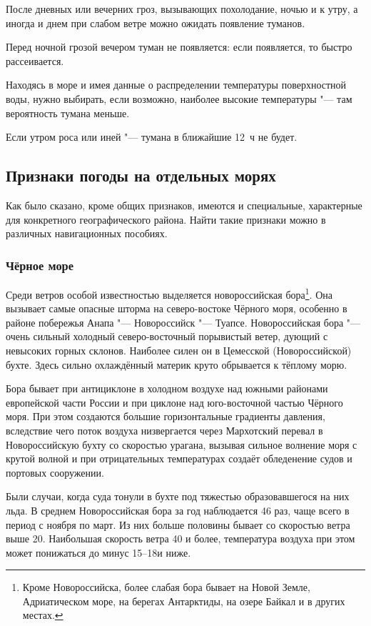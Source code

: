  После дневных или вечерних гроз, вызывающих похолодание, ночью
и к утру, а иногда и днем при слабом ветре можно ожидать появление
туманов.

 Перед ночной грозой вечером туман не появляется: если появляется,
то быстро рассеивается.

 Находясь в море и имея данные о распределении температуры
поверхностной воды, нужно выбирать, если возможно, наиболее высокие
температуры "--- там вероятность тумана меньше.

 Если утром роса или иней "--- тумана в ближайшие 12~ч не будет.

\subsection{Признаки погоды на отдельных морях}

Как было сказано, кроме общих признаков, имеются и специальные,
характерные для конкретного географического района. Найти такие
признаки можно в различных навигационных пособиях.

\subsubsection{Чёрное море}

Среди ветров особой известностью выделяется новороссийская
бора\footnote{Кроме Новороссийска, более слабая бора бывает на Новой
  Земле, Адриатическом море, на берегах Антарктиды, на озере Байкал и
  в других местах.}. Она вызывает самые опасные шторма на
северо-востоке Чёрного моря, особенно в районе побережья Анапа "---
Новороссийск "--- Туапсе. Новороссийская бора "--- очень сильный
холодный северо-восточный порывистый ветер, дующий с невысоких горных
склонов. Наиболее силен он в Цемесской (Новороссийской) бухте. Здесь
сильно охлаждённый материк круто обрывается к тёплому морю.

Бора бывает при антициклоне в холодном воздухе над южными районами
европейской части России и при циклоне над юго-восточной частью
Чёрного моря. При этом создаются большие горизонтальные градиенты
давления, вследствие чего поток воздуха низвергается через Мархотский
перевал в Новороссийскую бухту со скоростью урагана, вызывая сильное
волнение моря с крутой волной и при отрицательных температурах создаёт
обледенение судов и портовых сооружении.

Были случаи, когда суда тонули в бухте под тяжестью образовавшегося на
них льда. В среднем Новороссийская бора за год наблюдается 46 раз,
чаще всего в период с ноября по март. Из них больше половины бывает со
скоростью ветра выше 20\speedms. Наибольшая скорость ветра 40\speedms
и более, температура воздуха при этом может понижаться до минус
15--18\grC и ниже.

